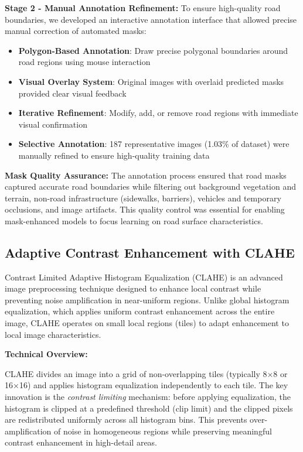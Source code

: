 \documentclass[12pt]{article}
\begin{document}
\textbf{Stage 2 - Manual Annotation Refinement:} To ensure high-quality road boundaries, we developed an interactive annotation interface that allowed precise manual correction of automated masks:

\begin{itemize}[itemsep=1pt,parsep=0pt,topsep=2pt]
\item \textbf{Polygon-Based Annotation}: Draw precise polygonal boundaries around road regions using mouse interaction
\item \textbf{Visual Overlay System}: Original images with overlaid predicted masks provided clear visual feedback
\item \textbf{Iterative Refinement}: Modify, add, or remove road regions with immediate visual confirmation
\item \textbf{Selective Annotation}: 187 representative images (1.03\% of dataset) were manually refined to ensure high-quality training data
\end{itemize}

\textbf{Mask Quality Assurance:}
The annotation process ensured that road masks captured accurate road boundaries while filtering out background vegetation and terrain, non-road infrastructure (sidewalks, barriers), vehicles and temporary occlusions, and image artifacts. This quality control was essential for enabling mask-enhanced models to focus learning on road surface characteristics.

\subsection{Adaptive Contrast Enhancement with CLAHE}

Contrast Limited Adaptive Histogram Equalization (CLAHE) is an advanced image preprocessing technique designed to enhance local contrast while preventing noise amplification in near-uniform regions. Unlike global histogram equalization, which applies uniform contrast enhancement across the entire image, CLAHE operates on small local regions (tiles) to adapt enhancement to local image characteristics.

\textbf{Technical Overview:}

CLAHE divides an image into a grid of non-overlapping tiles (typically 8×8 or 16×16) and applies histogram equalization independently to each tile. The key innovation is the \textit{contrast limiting} mechanism: before applying equalization, the histogram is clipped at a predefined threshold (clip limit) and the clipped pixels are redistributed uniformly across all histogram bins. This prevents over-amplification of noise in homogeneous regions while preserving meaningful contrast enhancement in high-detail areas.
\end{document}
